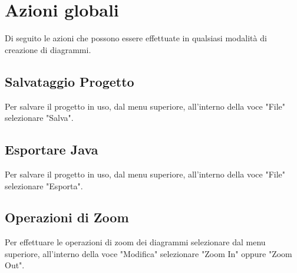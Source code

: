 \section{Azioni globali}
Di seguito le azioni che possono essere effettuate in qualsiasi modalità di creazione di diagrammi.

\subsection{Salvataggio Progetto}
Per salvare il progetto in uso, dal menu superiore, all'interno della voce "File" selezionare "Salva".

\subsection{Esportare Java}
Per salvare il progetto in uso, dal menu superiore, all'interno della voce "File" selezionare "Esporta".

\subsection{Operazioni di Zoom}
Per effettuare le operazioni di zoom dei diagrammi selezionare dal menu superiore, all'interno della voce "Modifica" selezionare "Zoom In" oppure "Zoom Out".